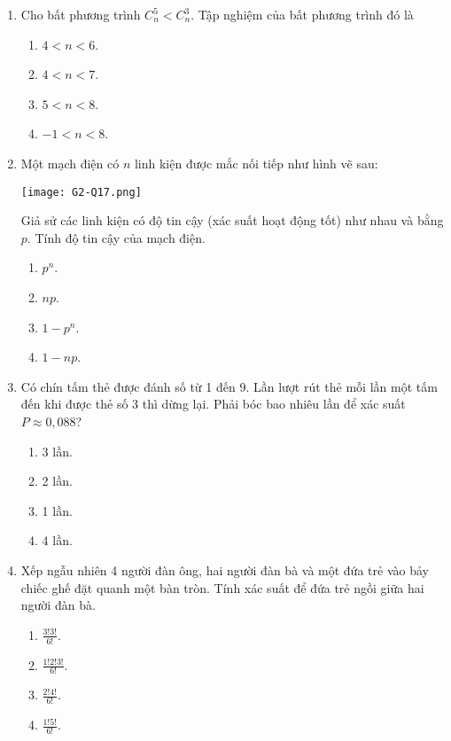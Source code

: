 \begin{enumerate}[label=\textbf{Câu \arabic*.},align=left,left=0cm..0cm,itemindent=*]
\begin{enumerate}[label=\textbf{\Alph*.},align=left,left=1cm..0cm,itemindent=*]
	\end{enumerate}
	\item Cho bất phương trình $C_{n}^{5}<C_{n}^{3}$. Tập nghiệm của bất phương trình đó là
	\begin{enumerate}[label=\textbf{\Alph*.},align=left,left=1cm..0cm,itemindent=*]
		\item $4<n<6$. \item $4<n<7$. \item $5<n<8$. \item $-1<n<8$.
	\end{enumerate}
	\item Một mạch điện có $n$ linh kiện được mắc nối tiếp như hình vẽ sau:\par
	{\centering\texttt{[image: G2-Q17.png]}\par}
	Giả sử các linh kiện có độ tin cậy (xác suất hoạt động tốt) như nhau và bằng $p$. Tính độ tin cậy của mạch điện.
	\begin{enumerate}[label=\textbf{\Alph*.},align=left,left=1cm..0cm,itemindent=*]
		\item $p^n$. \item $np$. \item $1-p^n$. \item $1-np$.
	\end{enumerate}
	\item Có chín tấm thẻ được đánh số từ 1 đến 9. Lần lượt rút thẻ mỗi lần một tấm đến khi được thẻ số 3 thì dừng lại. Phải bóc bao nhiêu lần để xác suất $P\approx 0,088$?
	\begin{enumerate}[label=\textbf{\Alph*.},align=left,left=1cm..0cm,itemindent=*]
		\item 3 lần. \item 2 lần. \item 1 lần. \item 4 lần.
	\end{enumerate}
	\item Xếp ngẫu nhiên 4 người đàn ông, hai người đàn bà và một đứa trẻ vào bảy chiếc ghế đặt quanh một bàn tròn. Tính xác suất để đứa trẻ ngồi giữa hai người đàn bà.
	\begin{enumerate}[label=\textbf{\Alph*.},align=left,left=1cm..0cm,itemindent=*]
		\item $\frac{3!3!}{6!}$. \item $\frac{1!2!3!}{6!}$. \item $\frac{2!4!}{6!}$. \item $\frac{1!5!}{6!}$.
	\end{enumerate}

\end{enumerate}
